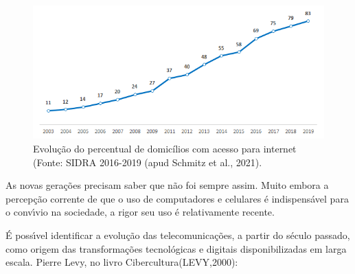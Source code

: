\documentclass[
12pt,		%
openright,	%
twoside,  %
a4paper,			%
chapter=TITLE,		%
english,			%
french,				%
spanish,			%
brazil				%
]{USPSC-classe/USPSC}
\begin{document}
\captionsetup{format=plain}
\begin{figure}[max size={\textwidth}{\textheight}]

\centering


\begin{minipage}[b]{0.4\linewidth}
        \centering
                \includegraphics[width=1.0\linewidth]{../../imagens/acesso-internet.png}
                \caption{Evolu\c{c}\~ao do percentual de domic\'{i}lios com acesso para internet (Fonte: SIDRA 2016-2019  (apud Schmitz et al., 2021).}
                \label{dc69b8cf40fae2ba00158e43d2db2d294110957c}
\end{minipage}%
\hspace{0.5cm}
\end{figure}



As novas gera\c{c}\~oes precisam saber que n\~ao foi sempre assim. Muito embora a percep\c{c}\~ao corrente de que o uso de computadores e celulares \'e indispens\'avel para o conv\'{\i}vio na sociedade, a rigor seu uso \'e relativamente recente.









\'E poss\'{\i}vel identificar a evolu\c{c}\~ao das telecomunica\c{c}\~oes, a partir do s\'eculo passado, como origem das transforma\c{c}\~oes tecnol\'ogicas e digitais disponibilizadas em larga escala. Pierre Levy, no livro \textquotedbl Cibercultura\textquotedbl (LEVY,2000):
\end{document}
